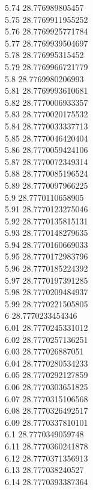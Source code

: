 {5.74	28.776989805457\\
5.75	28.7769911955252\\
5.76	28.7769925771784\\
5.77	28.7769939504697\\
5.78	28.776995315452\\
5.79	28.7769966721779\\
5.8	28.7769980206993\\
5.81	28.7769993610681\\
5.82	28.7770006933357\\
5.83	28.7770020175532\\
5.84	28.7770033337713\\
5.85	28.7770046420404\\
5.86	28.7770059424106\\
5.87	28.7770072349314\\
5.88	28.7770085196524\\
5.89	28.7770097966225\\
5.9	28.7770110658905\\
5.91	28.7770123275046\\
5.92	28.7770135815131\\
5.93	28.7770148279635\\
5.94	28.7770160669033\\
5.95	28.7770172983796\\
5.96	28.7770185224392\\
5.97	28.7770197391285\\
5.98	28.7770209484937\\
5.99	28.7770221505805\\
6	28.7770233454346\\
6.01	28.7770245331012\\
6.02	28.7770257136251\\
6.03	28.777026887051\\
6.04	28.7770280534233\\
6.05	28.7770292127859\\
6.06	28.7770303651825\\
6.07	28.7770315106568\\
6.08	28.7770326492517\\
6.09	28.7770337810101\\
6.1	28.7770349059748\\
6.11	28.7770360241878\\
6.12	28.7770371356913\\
6.13	28.777038240527\\
6.14	28.7770393387364\\
}
